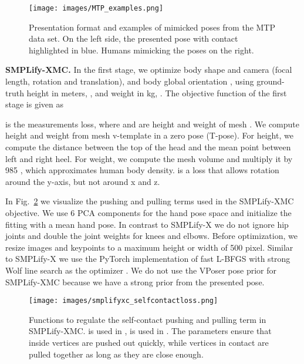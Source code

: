 \documentclass[final]{cvpr}
\newcommand{\smplifyxmc}{\mbox{SMPLify-XMC}\xspace}
\theoremstyle{definition}
\begin{document}
\begin{figure}[t]
	\begin{center}
		\texttt{[image: images/MTP\_examples.png]}
	\end{center}
	\caption{Presentation format and examples of mimicked poses from the MTP data set. On the left side, the presented pose with contact highlighted in blue. Humans mimicking the poses on the right.}
	\label{fig:canyoumimicthepose}
\end{figure}

\textbf{\smplifyxmc.} 
In the first stage, we optimize body shape  and camera  (focal length, rotation and translation), and body global orientation , using ground-truth height in meters, , and weight in kg, . The objective function of the first stage is given as

 is the measurements loss, where  and  are height and weight of mesh . 
We compute height and weight from mesh v-template in a zero pose (T-pose). 
For height, we compute the distance between the top of the head and the mean point between left and right heel. 
For weight, we compute the mesh volume and multiply it by 985 , which approximates human body density.
 is a loss that allows rotation around the y-axis, but not around x and z. 

In Fig.~\ref{fig:tanhfunctions_smplifyxc} we visualize the pushing and pulling terms used in the \smplifyxmc objective. We use 6 PCA components for the hand pose space and initialize the fitting with a mean hand pose. In contrast to SMPLify-X we do not ignore hip joints and double the joint weights for knees and elbows. Before optimization, we resize images and keypoints to a maximum height or width of 500 pixel. Similar to SMPLify-X we use the PyTorch implementation of fast L-BFGS with strong Wolf line search as the optimizer \cite{liu1989limited}. 
We do not use the VPoser pose prior for \smplifyxmc because we have a strong prior from the presented pose.

\begin{figure}
	\begin{center}
		\texttt{[image: images/smplifyxc\_selfcontactloss.png]}
	\end{center}
	\caption{Functions to regulate the self-contact pushing and pulling term in \smplifyxmc.  is used in ,  is used in . The parameters ensure that inside vertices are pushed out quickly, while vertices in contact are pulled together as long as they are close enough.}
	\label{fig:tanhfunctions_smplifyxc}
\end{figure}
\end{document}
